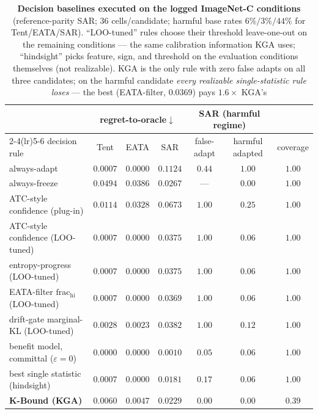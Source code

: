 \documentclass[conference]{IEEEtran}
\theoremstyle{plain}
\theoremstyle{definition}
\begin{document}
\begin{table}[t]\centering\small
\setlength{\tabcolsep}{4.5pt}
\begin{tabular}{lcccccc}
\toprule
 & \multicolumn{3}{c}{regret-to-oracle$\downarrow$} &
 \multicolumn{2}{c}{SAR (harmful regime)} & \\
\cmidrule(lr){2-4}\cmidrule(lr){5-6}
decision rule & Tent & EATA & SAR & false-adapt & harmful adapted & coverage \\
\midrule
always-adapt                          & $0.0007$ & $0.0000$ & $0.1124$ & $0.44$ & $1.00$ & $1.00$ \\
always-freeze                         & $0.0494$ & $0.0386$ & $0.0267$ & ---    & $0.00$ & $1.00$ \\
ATC-style confidence (plug-in)        & $0.0114$ & $0.0328$ & $0.0673$ & $1.00$ & $0.25$ & $1.00$ \\
ATC-style confidence (LOO-tuned)      & $0.0007$ & $0.0000$ & $0.0375$ & $1.00$ & $0.06$ & $1.00$ \\
entropy-progress (LOO-tuned)          & $0.0007$ & $0.0000$ & $0.0375$ & $1.00$ & $0.06$ & $1.00$ \\
EATA-filter $\mathrm{frac_{hi}}$ (LOO-tuned) & $0.0007$ & $0.0000$ & $0.0369$ & $1.00$ & $0.06$ & $1.00$ \\
drift-gate marginal-KL (LOO-tuned)    & $0.0028$ & $0.0023$ & $0.0382$ & $1.00$ & $0.12$ & $1.00$ \\
benefit model, committal ($\varepsilon{=}0$) & $0.0000$ & $0.0000$ & $\mathbf{0.0010}$ & $0.05$ & $0.06$ & $1.00$ \\
best single statistic (hindsight)     & $0.0007$ & $0.0000$ & $0.0181$ & $0.17$ & $0.06$ & $1.00$ \\
\textbf{K-Bound (KGA)}                & $0.0060$ & $0.0047$ & $0.0229$ & $\mathbf{0.00}$ & $\mathbf{0.00}$ & $0.39$ \\
\bottomrule
\end{tabular}
\caption{\textbf{Decision baselines executed on the logged ImageNet-C conditions}
(reference-parity SAR; $36$ cells/candidate; harmful base rates $6\%/3\%/44\%$ for
Tent/EATA/SAR). ``LOO-tuned'' rules choose their threshold leave-one-out on the
remaining conditions --- the same calibration information \textsc{KGA} uses;
``hindsight'' picks feature, sign, and threshold on the evaluation conditions
themselves (not realizable). \textsc{KGA} is the only rule with zero false adapts on
all three candidates; on the harmful candidate \emph{every realizable single-statistic
rule loses} --- the best (EATA-filter, $0.0369$) pays $1.6\times$ \textsc{KGA}'s
}
\end{table}
\end{document}
